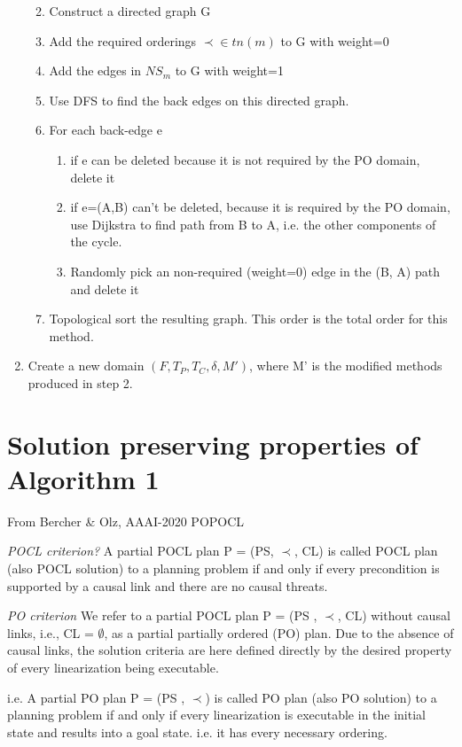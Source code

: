 \begin{enumerate}
\begin{enumerate}
\begin{itemize}
		\end{itemize}
		\item Construct a directed graph G
		\item Add the required orderings $\prec \in tn(m)$ to G with weight=0
		\item Add the edges in $NS_m$ to G with weight=1 \newline
		\item Use DFS to find the back edges on this directed graph.
		\item For each back-edge e
		\begin{enumerate}
			\item if e can be deleted because it is not required by the PO domain, delete it
			\item if e=(A,B) can't be deleted, because it is required by the PO domain, use Dijkstra to find path from B to A, i.e. the other components of the cycle.
			\item Randomly pick an non-required (weight=0) edge in the (B, A) path and delete it
		\end{enumerate}
		\item Topological sort the resulting graph. This order is the total order for this method.
	\end{enumerate}
\item Create a new domain $(F, T_P, T_C, \delta, M')$, where M' is the modified methods produced in step 2.
\end{enumerate} 



\section{Solution preserving properties of Algorithm 1}
From Bercher \& Olz, AAAI-2020 POPOCL 

\emph{POCL criterion?} A partial POCL plan P = (PS, $\prec$, CL) is called POCL plan (also POCL solution) to a planning problem if and only if every precondition is supported by a causal link and there are no causal threats.


\emph{PO criterion} We refer to a partial POCL plan P = (PS , $\prec$, CL) without causal links, i.e., CL = $\emptyset$, as a partial partially ordered (PO) plan. Due to the absence of causal links, the solution criteria are here defined directly by the desired property of every linearization being executable.

i.e. A partial PO plan P = (PS , $\prec$) is called PO plan (also PO solution) to a planning problem if and only
if every linearization is executable in the initial state and results into a goal state.
i.e. it has every necessary ordering.

